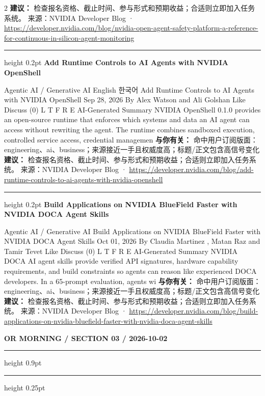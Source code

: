 \documentclass[10.5pt]{ctexart}
\begin{document}
\begin{multicols}{2}
\textbf{建议：} 检查报名资格、截止时间、参与形式和预期收益；合适则立即加入任务系统。
{\footnotesize\color{ormuted} 来源：NVIDIA Developer Blog · \url{https://developer.nvidia.com/blog/nvidia-open-agent-safety-platform-a-reference-for-continuous-in-silicon-agent-monitoring}}
\vspace{2mm}
\hrule height 0.2pt
\vspace{2mm}
{\large\bfseries Add Runtime Controls to AI Agents with NVIDIA OpenShell}\par
Agentic AI / Generative AI English 한국어 Add Runtime Controls to AI Agents with NVIDIA OpenShell Sep 28, 2026 By Alex Watson and Ali Golshan Like Discuss (0) L T F R E AI-Generated Summary NVIDIA OpenShell 0.1.0 provides an open-source runtime that enforces which systems and data an AI agent can access without rewriting the agent. The runtime combines sandboxed execution, controlled service access, credential managemen
\textbf{与你有关：} 命中用户订阅版面：engineering、ai、business；来源接近一手且权威度高；标题/正文包含高信号变化
\textbf{建议：} 检查报名资格、截止时间、参与形式和预期收益；合适则立即加入任务系统。
{\footnotesize\color{ormuted} 来源：NVIDIA Developer Blog · \url{https://developer.nvidia.com/blog/add-runtime-controls-to-ai-agents-with-nvidia-openshell}}
\vspace{2mm}
\hrule height 0.2pt
\vspace{2mm}
{\large\bfseries Build Applications on NVIDIA BlueField Faster with NVIDIA DOCA Agent Skills}\par
Agentic AI / Generative AI Build Applications on NVIDIA BlueField Faster with NVIDIA DOCA Agent Skills Oct 01, 2026 By Claudia Martinez , Matan Raz and Tamir Tevet Like Discuss (0) L T F R E AI-Generated Summary NVIDIA DOCA AI agent skills provide verified API signatures, hardware capability requirements, and build constraints so agents can reason like experienced DOCA developers. In a 65-prompt evaluation, agents wi
\textbf{与你有关：} 命中用户订阅版面：engineering、ai、business；来源接近一手且权威度高；标题/正文包含高信号变化
\textbf{建议：} 检查报名资格、截止时间、参与形式和预期收益；合适则立即加入任务系统。
{\footnotesize\color{ormuted} 来源：NVIDIA Developer Blog · \url{https://developer.nvidia.com/blog/build-applications-on-nvidia-bluefield-faster-with-nvidia-doca-agent-skills}}
\end{multicols}
\newpage
{\small\bfseries OR MORNING / SECTION 03 / 2026-10-02}
\vspace{2mm}
\hrule height 0.9pt
\vspace{1.5mm}
\hrule height 0.25pt
\vspace{4mm}
\end{document}
